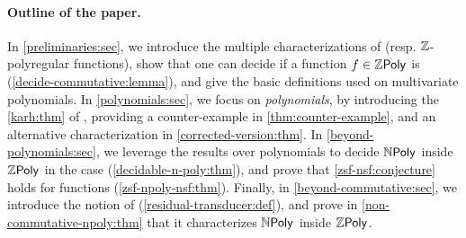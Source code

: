 \paragraph{Outline of the paper.} In \cref{preliminaries:sec}, we introduce the
multiple characterizations of  (resp.
$\mathbb{Z}$-polyregular functions), show that one can decide if a function $f \in
\ZPoly$ is  (\cref{decide-commutative:lemma}), and give the
basic definitions used on multivariate polynomials. In \cref{polynomials:sec},
we focus on \emph{polynomials}, by introducing the \cref{karh:thm} of
\textcite{KARH77}, providing a counter-example in \cref{thm:counter-example},
and an alternative characterization in \cref{corrected-version:thm}. In
\cref{beyond-polynomials:sec}, we leverage the results over polynomials to
decide $\NPoly$ inside $\ZPoly$ in the  case
(\cref{decidable-n-poly:thm}), and prove that \cref{zsf-nsf:conjecture} holds
for  functions (\cref{zsf-npoly-nsf:thm}). Finally, in
\cref{beyond-commutative:sec}, we introduce the notion of  (\cref{residual-transducer:def}), and prove in
\cref{non-commutative-npoly:thm} that it characterizes $\NPoly$ inside
$\ZPoly$.
